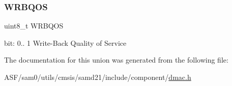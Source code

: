 \subsubsection{\texorpdfstring{WRBQOS}{WRBQOS}}
{\footnotesize\ttfamily uint8\+\_\+t W\+R\+B\+Q\+OS}

bit\+: 0.. 1 Write-\/\+Back Quality of Service 

The documentation for this union was generated from the following file\+:\begin{DoxyCompactItemize}
\item 
A\+S\+F/sam0/utils/cmsis/samd21/include/component/\mbox{\hyperlink{component_2dmac_8h}{dmac.\+h}}\end{DoxyCompactItemize}
